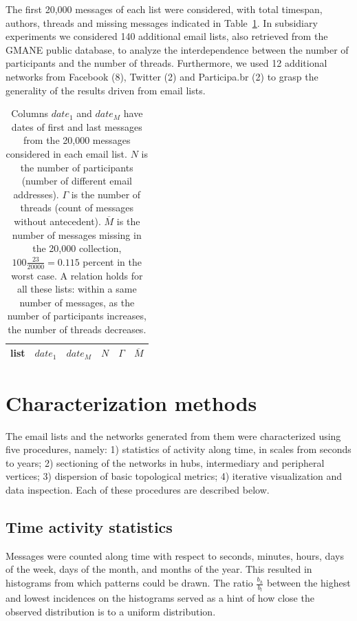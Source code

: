 \documentclass[%
	aip,
	jmp,%
	amsmath,amssymb,
	reprint,%
]{revtex4-1}
\begin{document}
The first 20,000 messages of each list were considered, with total timespan, authors, threads and missing messages indicated in Table~\ref{tab:genLists}.
In subsidiary experiments we considered 140 additional email lists, also retrieved from the GMANE public database, to analyze the interdependence between the number of participants and the number of threads. Furthermore, we used 12 additional networks from Facebook (8), Twitter (2) and Participa.br (2) to grasp the generality of the results driven from email lists.

\begin{table}
	\centering
	\caption{Columns $date_1$ and $date_M$ have dates of first and last messages from the 20,000 messages considered in each email list.
		$N$ is the number of participants (number of different email addresses).
		$\Gamma$ is the number of threads (count of messages without antecedent).
		$\overline{M}$ is the number of messages missing in the 20,000 collection, $100\frac{23}{20000}=0.115$ percent in the worst case.
	A relation holds for all these lists: within a same number of messages, as the number of participants increases, the number of threads decreases.}
	\label{tab:genLists}
	\begin{tabular}{|l|c|c|c|c|c|}\hline
		list & $date_1$ & $date_{M}$    & $N$  & $\Gamma$ & $\overline{M}$ \\\hline
		
	\end{tabular}
\end{table}


\section{Characterization methods}\label{sec:carac}
The email lists and the networks generated from them were characterized using five procedures, namely: 1) statistics of activity along time, in scales from seconds to years; 2) sectioning of the networks in hubs, intermediary and peripheral vertices; 3) dispersion of basic topological metrics; 4) iterative visualization and data inspection.
Each of these procedures are described below.

\subsection{Time activity statistics}\label{sec:mtime}
Messages were counted along time with respect to seconds, minutes, hours, days of the week, days of the month, and months of the year. This resulted in histograms from which patterns could be drawn. The ratio $\frac{b_h}{b_l}$ between the highest and lowest incidences on the histograms served as a hint of how close the observed distribution is to a uniform distribution.
\end{document}
